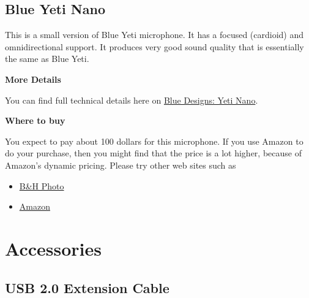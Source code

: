 \begin{gram}
\end{gram}

\subsection{Blue Yeti Nano}
\label{sec:equipment::blueyetinano}

\begin{gram}
\label{grm:equipment::blueyetinano::main}
%
This is a small version of Blue Yeti microphone.
%
It has a focused (cardioid) and omnidirectional support.
%
It produces very good sound quality that is essentially the same as Blue Yeti.


\textbf{More Details}

You can find full technical details here on \href{https://www.bluedesigns.com/products/yeti-nano/}{Blue Designs: Yeti Nano}.


\textbf{Where to buy}

You expect to pay about 100 dollars for this microphone.  If you use Amazon to do your purchase, then you might find that the price is a lot higher, because of Amazon's dynamic pricing.  Please try other web sites such as 

\begin{itemize}
\item
\href{https://www.bhphotovideo.com/c/l-search?q=Blue%20Yeti%20Nano&N=0}{B\&H Photo}
\item 
\href{https://www.amazon.com/Blue-Yeti-Premium-Recording-Streaming/dp/B07DTTGZ7M}{Amazon}
\end{itemize}
\end{gram}

\begin{gram}
\end{gram}

\section{Accessories}
\label{sec:equipment::accessories}

\subsection{USB 2.0 Extension Cable}
\label{sec:equipment::accessories::usbextend}

